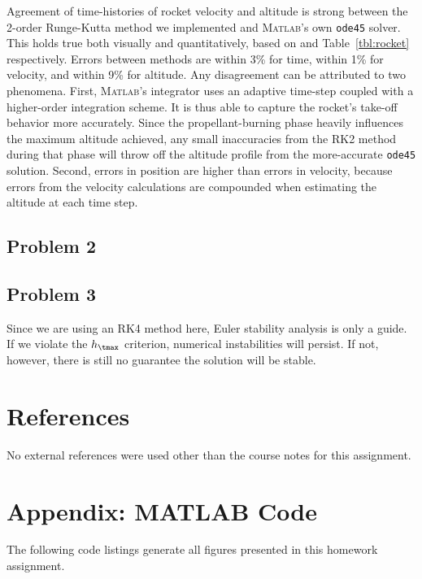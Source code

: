 \documentclass[12pt]{article}
\begin{document}
Agreement of time-histories of rocket velocity and altitude is strong between the 2\nd-order Runge-Kutta method we implemented and \textsc{Matlab}'s own \lstinline|ode45| solver. This holds true both visually and quantitatively, based on  and Table~\ref{tbl:rocket} respectively. Errors between methods are within 3\% for time, within 1\% for velocity, and within 9\% for altitude. Any disagreement can be attributed to two phenomena. First, \textsc{Matlab}'s integrator uses an adaptive time-step coupled with a higher-order integration scheme. It is thus able to capture the rocket's take-off behavior more accurately. Since the propellant-burning phase heavily influences the maximum altitude achieved, any small inaccuracies from the RK2 method during that phase will throw off the altitude profile from the more-accurate \lstinline|ode45| solution. Second, errors in position are higher than errors in velocity, because errors from the velocity calculations are compounded when estimating the altitude at each time step.

\subsection{Problem 2}

\subsection{Problem 3}

Since we are using an RK4 method here, Euler stability analysis is only a guide. If we violate the $h_\tmax$ criterion, numerical instabilities will persist. If not, however, there is still no guarantee the solution will be stable.

\section{References} %

No external references were used other than the course notes for this assignment.


\section*{Appendix: MATLAB Code} %

The following code listings generate all figures presented in this homework assignment.




\end{document}
